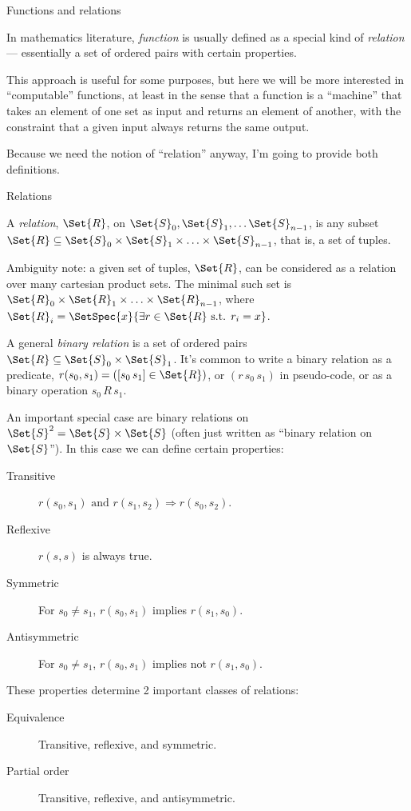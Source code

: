 \begin{plSection}{Functions and relations}
\label{sec:Functions-and-relations}

In mathematics literature, \textit{function} is usually defined as
a special kind of \textit{relation} --- essentially a set of
ordered pairs with certain properties.

This approach is useful for some purposes, but here we will be
more interested in ``computable'' functions, at least in the sense
that a function is a ``machine'' that takes an element of one set
as input and returns an element of another, with the constraint
that a given input always returns the same output.

Because we need the notion of ``relation'' anyway, I'm going to
provide both definitions.

\begin{plSection}{Relations}
\label{sec:Relations}

A \textit{relation}, 
$\Set{R}$, on $\Set{S}_0, \Set{S}_1, \ldots \Set{S}_{n-1}$,  
is any subset 
$\Set{R} \subseteq \Set{S}_0 \times \Set{S}_1 \times \ldots 
\times \Set{S}_{n-1}$,
that is, a set of tuples.

Ambiguity note: a given set of tuples, $\Set{R}$, can be
considered as a relation over many cartesian product sets.
The minimal such set is 
$\Set{R}_0 \times \Set{R}_1 \times \ldots \times
\Set{R}_{n-1}$, 
where 
$\Set{R}_i = \SetSpec{ x }{ \exists r 
\in \Set{R} \text{ s.t. } r_i = x }$.

A general \textit{binary relation} is a set of ordered
pairs $\Set{R} \subseteq \Set{S}_0 \times \Set{S}_1$.
It's common to write a binary relation as a predicate, 
$r(s_0,s_1) = ([s_0 \, s_1] \in \Set{R})$,
or $(r \, s_0 \, s_1)$ in pseudo-code,
or as a binary operation $s_0 \, R \, s_1$.

An important special case
are binary relations on $\Set{S}^2 = \Set{S} \times \Set{S}$
(often just written as ``binary relation on $\Set{S}$''). 
In this case we can define certain properties:

\begin{description}
\item[Transitive]
$r(s_0,s_1) \text{ and } r(s_1,s_2) \Rightarrow r(s_0,s_2)$.
\item[Reflexive] $r(s,s)$ is always true.
\item[Symmetric] For $s_0 \neq s_1$, $r(s_0,s_1)$ implies
$r(s_1,s_0)$.
\item[Antisymmetric] For $s_0 \neq s_1$, $r(s_0,s_1)$ implies not
$r(s_1,s_0)$.
\end{description}
These properties determine 2 important classes of relations:
\begin{description}
\item[Equivalence] Transitive, reflexive, and symmetric.
\item[Partial order] \label{def:partial-order}
Transitive, reflexive, and antisymmetric.
\end{description}


\end{plSection}
\end{plSection}
